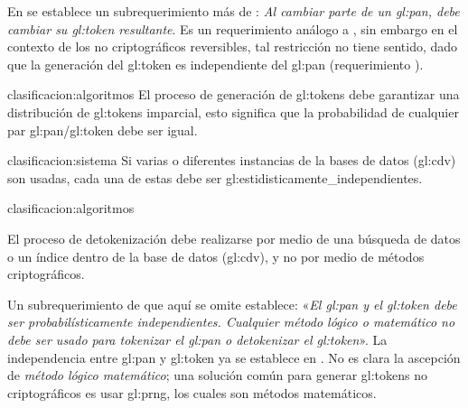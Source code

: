 En \cite{pci_tokens} se establece un subrequerimiento más de
: \textit{Al cambiar parte de un
\gls{gl:pan}, debe cambiar su \gls{gl:token} resultante}. Es un requerimiento
análogo a , sin embargo en el contexto
de los  no criptográficos reversibles, tal restricción no tiene sentido, dado
que  la generación del \gls{gl:token} es independiente del \gls{gl:pan}
(requerimiento ).

{clasificacion:algoritmos}
{
  El proceso de generación de \glspl{gl:token} debe garantizar una
  distribución de \glspl{gl:token} imparcial, esto significa que la
  probabilidad de cualquier par \gls{gl:pan}/\gls{gl:token} debe ser igual.
}

{clasificacion:sistema}
{
  Si varias o diferentes instancias de la bases de datos (\gls{gl:cdv}) son
  usadas, cada una de estas debe ser
  \glspl{gl:estidisticamente_independiente}.
}

{clasificacion:algoritmos}
{
  El proceso de detokenización debe realizarse por medio de una búsqueda de
  datos o un índice dentro de la base de datos (\gls{gl:cdv}), y no por medio
  de métodos criptográficos.

}

Un subrequerimiento de  que
aquí se omite establece: «\textit{El \gls{gl:pan} y el \gls{gl:token} debe ser
probabilísticamente independientes. Cualquier método lógico o matemático no
debe ser usado para \textit{tokenizar} el \gls{gl:pan} o \textit{detokenizar}
el \gls{gl:token}}». La independencia entre \gls{gl:pan} y \gls{gl:token} ya
se establece en . No es
clara la ascepción de \textit{método lógico matemático}; una solución
común para generar \glspl{gl:token} no criptográficos es usar \gls{gl:prng},
los cuales son métodos matemáticos.

